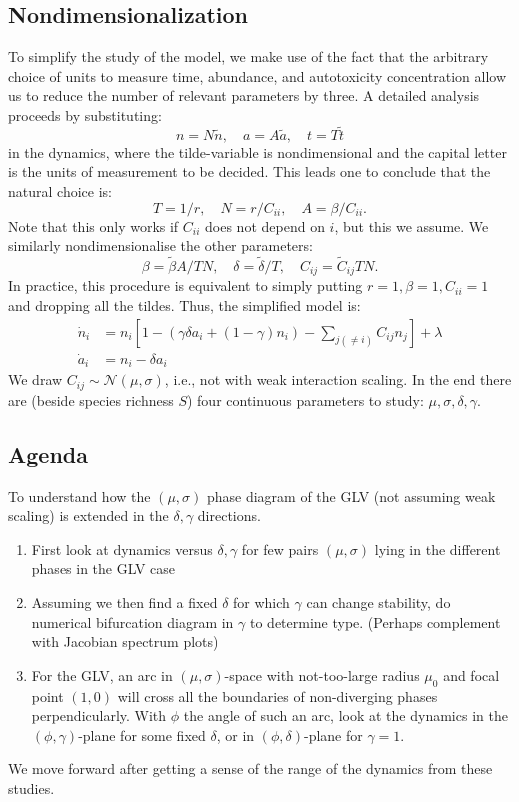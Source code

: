 \documentclass[11pt,a4paper,fleqn]{scrartcl}
\begin{document}
\subsection{Nondimensionalization}
To simplify the study of the model, we make use of the fact that the arbitrary choice of units to measure time, abundance, and autotoxicity concentration allow us to reduce the number of relevant parameters by three. A detailed analysis proceeds by substituting:
\begin{equation}
n = N\tilde{n}, \quad a = A\tilde{a}, \quad t= T\tilde{t}
\end{equation}
in the dynamics, where the tilde-variable is nondimensional and the capital letter is the units of measurement to be decided. This leads one to conclude that the natural choice is:
\begin{equation}
T = 1/r, \quad N= r/C_{ii}, \quad A=\beta/C_{ii}.
\end{equation}
Note that this only works if $C_{ii}$ does not depend on $i$, but this we assume. We similarly nondimensionalise the other parameters:
\begin{equation}
\beta = \tilde{\beta}A/TN, \quad \delta = \tilde{\delta}/T, \quad C_{ij} = \tilde{C}_{ij}TN.
\end{equation}
In practice, this procedure is equivalent to simply putting $r=1,\beta=1,C_{ii}=1$ and dropping all the tildes. Thus, the simplified model is:
\begin{align}
\label{eqnologspecies}
\dot{n}_i &= n_i\left[ 1 - \left(\gamma \delta a_i + (1-\gamma)n_i\right) - \sum_{j(\neq i)} C_{ij} n_j \right] + \lambda\\
\label{eqnologautotox}
\dot{a}_i &= n_i - \delta a_i
\end{align}
We draw $C_{ij}\sim \mathcal{N}(\mu,\sigma)$, i.e., not with weak interaction scaling. In the end there are (beside species richness $S$) four continuous parameters to study: $\mu,\sigma,\delta,\gamma$.

\subsection{Agenda}
To understand how the $(\mu,\sigma)$ phase diagram of the GLV (not assuming weak scaling) is extended in the $\delta,\gamma$ directions.
\begin{enumerate}
    \item First look at dynamics versus $\delta,\gamma$ for few pairs $(\mu,\sigma)$ lying in the different phases in the GLV case
    \item Assuming we then find a fixed $\delta$ for which $\gamma$ can change stability, do numerical bifurcation diagram in $\gamma$ to determine type. (Perhaps complement with Jacobian spectrum plots)
    \item For the GLV, an arc in $(\mu,\sigma)$-space with not-too-large radius $\mu_0$ and focal point $(1,0)$ will cross all the boundaries of non-diverging phases perpendicularly. With $\phi$ the angle of such an arc, look at the dynamics in the $(\phi,\gamma)$-plane for some fixed $\delta$, or in $(\phi,\delta)$-plane for $\gamma=1$.
\end{enumerate}

We move forward after getting a sense of the range of the dynamics from these studies.
\end{document}
